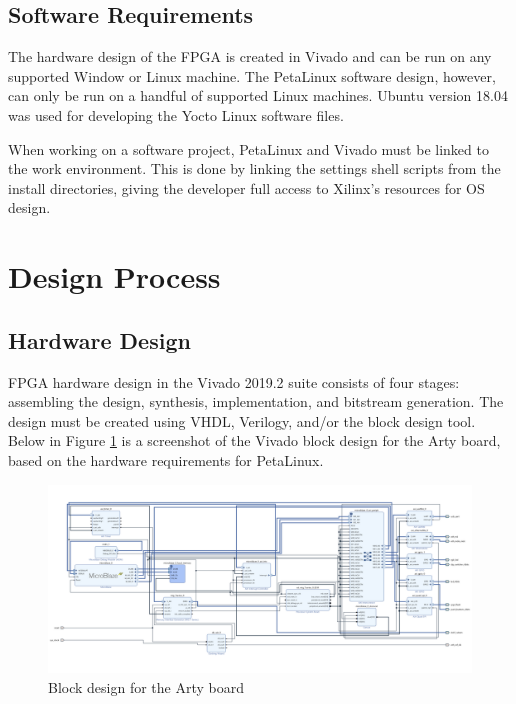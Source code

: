 \documentclass{article}
\begin{document}
\subsection{Software Requirements}
The hardware design of the FPGA is created in Vivado and can be run on any supported Window or Linux machine. The PetaLinux software design, however, can only be run on a handful of supported Linux machines. Ubuntu version 18.04 was used for developing the Yocto Linux software files.\par
When working on a software project, PetaLinux and Vivado must be linked to the work environment. This is done by linking the settings shell scripts from the install directories, giving the developer full access to Xilinx's resources for OS design.\par

\section{Design Process}
\subsection{Hardware Design}
FPGA hardware design in the Vivado 2019.2 suite consists of four stages: assembling the design, synthesis, implementation, and bitstream generation. The design must be created using VHDL, Verilogy, and/or the block design tool. Below in Figure \ref{fig:block} is a screenshot of the Vivado block design for the Arty board, based on the hardware requirements for PetaLinux.\par

\begin{figure}[!htb]
	\centering
	\includegraphics [width=\textwidth] {block_design.png}
	\caption{Block design for the Arty board}
	\label{fig:block}
\end{figure}
\end{document}
